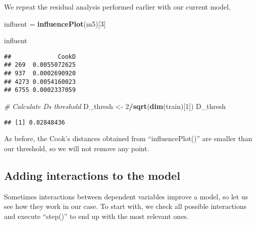 \documentclass[
]{article}
\newenvironment{Shaded}{\begin{snugshade}}{\end{snugshade}}
\newcommand{\CommentTok}[1]{\textcolor[rgb]{0.56,0.35,0.01}{\textit{#1}}}
\newcommand{\DecValTok}[1]{\textcolor[rgb]{0.00,0.00,0.81}{#1}}
\newcommand{\FunctionTok}[1]{\textcolor[rgb]{0.13,0.29,0.53}{\textbf{#1}}}
\newcommand{\NormalTok}[1]{#1}
\newcommand{\OtherTok}[1]{\textcolor[rgb]{0.56,0.35,0.01}{#1}}
\newcommand{\SpecialCharTok}[1]{\textcolor[rgb]{0.81,0.36,0.00}{\textbf{#1}}}
\begin{document}
We repeat the residual analysis performed earlier with our current
model.

\begin{Shaded}
\begin{Highlighting}[]
\NormalTok{influent }\OtherTok{=} \FunctionTok{influencePlot}\NormalTok{(m5)[}\DecValTok{3}\NormalTok{]}
\end{Highlighting}
\end{Shaded}

\begin{Shaded}
\begin{Highlighting}[]
\NormalTok{influent}
\end{Highlighting}
\end{Shaded}

\begin{verbatim}
##             CookD
## 269  0.0055072625
## 937  0.0002690920
## 4273 0.0054160023
## 6755 0.0002337059
\end{verbatim}

\begin{Shaded}
\begin{Highlighting}[]
\CommentTok{\# Calculate D\textquotesingle{}s threshold}
\NormalTok{D\_thresh }\OtherTok{\textless{}{-}} \DecValTok{2}\SpecialCharTok{/}\FunctionTok{sqrt}\NormalTok{(}\FunctionTok{dim}\NormalTok{(train)[}\DecValTok{1}\NormalTok{])}
\NormalTok{D\_thresh}
\end{Highlighting}
\end{Shaded}

\begin{verbatim}
## [1] 0.02848436
\end{verbatim}

As before, the Cook's distances obtained from ``influencePlot()'' are
smaller than our threshold, so we will not remove any point.

\hypertarget{adding-interactions-to-the-model}{%
\subsection{Adding interactions to the
model}\label{adding-interactions-to-the-model}}

Sometimes interactions between dependent variables improve a model, so
let us see how they work in our case. To start with, we check all
possible interactions and execute ``step()'' to end up with the most
relevant ones.
\end{document}
